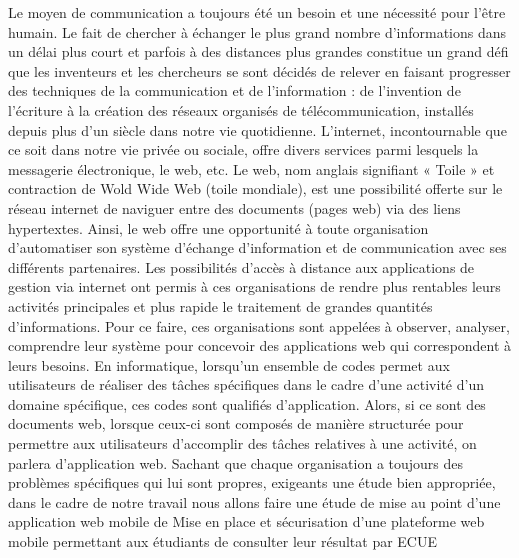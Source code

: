 
Le moyen de communication a toujours été un besoin et une nécessité pour l'être humain. Le fait de chercher à échanger le plus grand nombre d'informations dans un délai plus court et parfois à des distances plus grandes constitue un grand défi que les inventeurs et les chercheurs se sont décidés de relever en faisant progresser des techniques de la communication et de l'information : de l'invention de l'écriture à la création des réseaux organisés de télécommunication, installés depuis plus d'un siècle dans notre vie quotidienne.
L'internet, incontournable que ce soit dans notre vie privée ou sociale, offre divers services parmi lesquels la messagerie électronique, le web, etc.
Le web, nom anglais signifiant « Toile » et contraction de Wold Wide Web (toile mondiale), est une possibilité offerte sur le réseau internet de naviguer entre des documents (pages web) via des liens hypertextes. Ainsi, le web offre une opportunité à toute organisation d'automatiser son système d'échange d'information et de communication avec ses différents partenaires.
Les possibilités d'accès à distance aux applications de gestion via internet ont permis à ces organisations de rendre plus rentables leurs activités principales et plus rapide le traitement de grandes quantités d'informations.
Pour ce faire, ces organisations sont appelées à observer, analyser, comprendre leur système pour concevoir des applications web qui correspondent à leurs besoins.
En informatique, lorsqu'un ensemble de codes permet aux utilisateurs de réaliser des tâches spécifiques dans le cadre d'une activité d'un domaine spécifique, ces codes sont qualifiés d'application. Alors, si ce sont des documents web, lorsque ceux-ci sont composés de manière structurée pour permettre aux utilisateurs d'accomplir des tâches relatives à une activité, on parlera d'application web. Sachant que chaque organisation a toujours des problèmes spécifiques qui lui sont propres, exigeants une étude bien appropriée, dans le cadre de notre travail nous allons faire une étude de mise au point d'une application web mobile de Mise en place et sécurisation d’une plateforme web mobile permettant aux étudiants de consulter leur résultat par ECUE  

